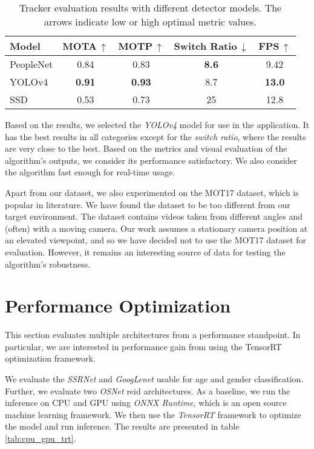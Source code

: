 \begin{table}[hbt!]
    \centering
    \begin{tabular}{l|c|c|c|c}
        \hline
        Model & MOTA\,$\uparrow$ & MOTP\,$\uparrow$ & Switch Ratio\,$\downarrow$ & FPS\,$\uparrow$ \\
        \hline
        PeopleNet & 0.84 & 0.83 & \textbf{8.6} & 9.42 \\
        YOLOv4 & \textbf{0.91} & \textbf{0.93} & 8.7 & \textbf{13.0} \\
        SSD & 0.53 & 0.73 & 25 & 12.8
    \end{tabular}
    \caption{Tracker evaluation results with different detector models. The arrows indicate low or high optimal metric values.}
    \label{tab:tracker_results}
\end{table}

Based on the results, we selected the \textit{YOLOv4} model for use in the application. It has the best results in all categories except for the \textit{switch ratio}, where the results are very close to the best. Based on the metrics and visual evaluation of the algorithm's outputs, we consider its performance satisfactory.  We also consider the algorithm fast enough for real-time usage. 

Apart from our dataset, we also experimented on the MOT17\cite{MOT16} dataset, which is popular in literature. We have found the dataset to be too different from our target environment. The dataset contains videos taken from different angles and (often) with a moving camera. Our work assumes a stationary camera position at an elevated viewpoint, and so we have decided not to use the MOT17 dataset for evaluation. However, it remains an interesting source of data for testing the algorithm's robustness.

\section{Performance Optimization}

This section evaluates multiple architectures from a performance standpoint. In particular, we are interested in performance gain from using the TensorRT optimization framework.

We evaluate the \textit{SSRNet}\cite{yang2018ssr} and \textit{GoogLenet}\cite{szegedy2015going_googlenet} usable for age and gender classification. Further, we evaluate two \textit{OSNet}\cite{osnet} \gls{reid} architectures. As a baseline, we run the inference on CPU and GPU using \textit{ONNX Runtime}\cite{onnxruntime}, which is an open source machine learning framework. We then use the \textit{TensorRT} framework to optimize the model and run inference. The results are presented in table \ref{tab:cpu_gpu_trt}.

